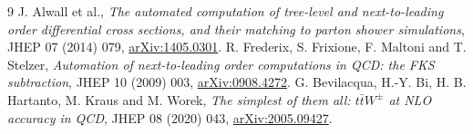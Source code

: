 \documentclass[11pt,a4paper]{article}
\begin{document}
\begin{thebibliography}{9}
 J. Alwall et al.,
\emph{The automated computation of tree-level and next-to-leading order
differential cross sections, and their matching to parton shower simulations},
JHEP 07 (2014) 079, \href{https://arxiv.org/abs/1405.0301}{arXiv:1405.0301}.
 R. Frederix, S. Frixione, F. Maltoni and T. Stelzer,
\emph{Automation of next-to-leading order computations in QCD: the FKS subtraction},
JHEP 10 (2009) 003, \href{https://arxiv.org/abs/0908.4272}{arXiv:0908.4272}.
 G. Bevilacqua, H.-Y. Bi, H. B. Hartanto, M. Kraus and M. Worek,
\emph{The simplest of them all: $t\bar tW^\pm$ at NLO accuracy in QCD},
JHEP 08 (2020) 043, \href{https://arxiv.org/abs/2005.09427}{arXiv:2005.09427}.
\end{thebibliography}
\end{document}
